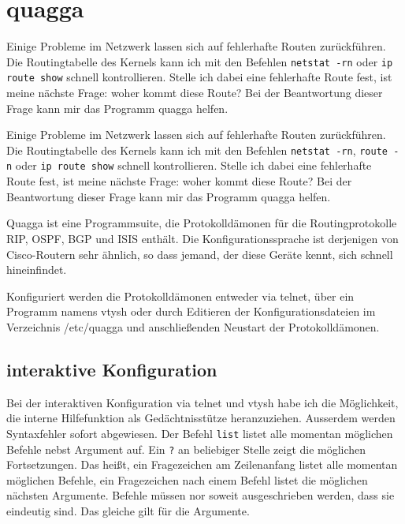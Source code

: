\section{quagga}
\label{sec:netz-werkzeuge-quagga}
\begin{abstractsec}
  Einige Probleme im Netzwerk lassen sich auf fehlerhafte Routen zurückführen.
  Die Routingtabelle des Kernels kann ich mit den Befehlen \verb?netstat -rn?
  oder \verb?ip route show? schnell kontrollieren.
  Stelle ich dabei eine fehlerhafte Route fest, ist meine nächste Frage: woher
  kommt diese Route?
  Bei der Beantwortung dieser Frage kann mir das Programm quagga helfen.
\end{abstractsec}
\begin{normaltext}
  Einige Probleme im Netzwerk lassen sich auf fehlerhafte Routen zurückführen.
  Die Routingtabelle des Kernels kann ich mit den Befehlen \verb?netstat -rn?,
  \verb?route -n? oder \verb?ip route show? schnell kontrollieren.
  Stelle ich dabei eine fehlerhafte Route fest, ist meine nächste Frage: woher
  kommt diese Route?
  Bei der Beantwortung dieser Frage kann mir das Programm quagga helfen.

  Quagga ist eine Programmsuite, die Protokolldämonen für die
  Routingprotokolle RIP, OSPF, BGP und ISIS enthält. Die Konfigurationssprache
  ist derjenigen von Cisco-Routern sehr ähnlich, so dass jemand, der diese
  Geräte kennt, sich schnell hineinfindet.

  Konfiguriert werden die Protokolldämonen entweder via telnet, über ein
  Programm namens vtysh oder durch Editieren der Konfigurationsdateien im
  Verzeichnis /etc/quagga und anschließenden Neustart der Protokolldämonen.

  \subsection*{interaktive Konfiguration}

  Bei der interaktiven Konfiguration via telnet und vtysh habe ich die
  Möglichkeit, die interne Hilfefunktion als Gedächtnisstütze heranzuziehen.
  Ausserdem werden Syntaxfehler sofort abgewiesen.
  Der Befehl \verb?list? listet alle momentan möglichen Befehle nebst Argument
  auf.
  Ein \verb!?! an beliebiger Stelle zeigt die möglichen Fortsetzungen. Das
  heißt, ein Fragezeichen am Zeilenanfang listet alle momentan möglichen
  Befehle, ein Fragezeichen nach einem Befehl listet die möglichen nächsten
  Argumente.
  Befehle müssen nor soweit ausgeschrieben werden, dass sie eindeutig sind.
  Das gleiche gilt für die Argumente.


\end{normaltext}
